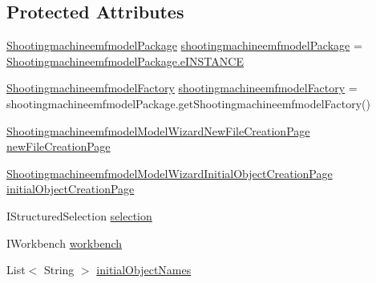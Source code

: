 \subsection*{Protected Attributes}
\begin{DoxyCompactItemize}
\item 
\hyperlink{interfaceshootingmachineemfmodel_1_1_shootingmachineemfmodel_package}{Shootingmachineemfmodel\-Package} \hyperlink{classshootingmachineemfmodel_1_1presentation_1_1_shootingmachineemfmodel_model_wizard_a8a2843875980f02f95e83eee1a814c6a}{shootingmachineemfmodel\-Package} = \hyperlink{interfaceshootingmachineemfmodel_1_1_shootingmachineemfmodel_package_a1a262932821c602a7ee1e9cbb214c625}{Shootingmachineemfmodel\-Package.\-e\-I\-N\-S\-T\-A\-N\-C\-E}
\item 
\hyperlink{interfaceshootingmachineemfmodel_1_1_shootingmachineemfmodel_factory}{Shootingmachineemfmodel\-Factory} \hyperlink{classshootingmachineemfmodel_1_1presentation_1_1_shootingmachineemfmodel_model_wizard_a3a08336aea063feb905341ca00505e65}{shootingmachineemfmodel\-Factory} = shootingmachineemfmodel\-Package.\-get\-Shootingmachineemfmodel\-Factory()
\item 
\hyperlink{classshootingmachineemfmodel_1_1presentation_1_1_shootingmachineemfmodel_model_wizard_1_1_shooti0374ed52aef5c158aa4d43d4797c2d9f}{Shootingmachineemfmodel\-Model\-Wizard\-New\-File\-Creation\-Page} \hyperlink{classshootingmachineemfmodel_1_1presentation_1_1_shootingmachineemfmodel_model_wizard_a8c6b0f5201dfc93a032ac20be8f15641}{new\-File\-Creation\-Page}
\item 
\hyperlink{classshootingmachineemfmodel_1_1presentation_1_1_shootingmachineemfmodel_model_wizard_1_1_shootia3fbc6bd8d9af3fefbb57f601e613dce}{Shootingmachineemfmodel\-Model\-Wizard\-Initial\-Object\-Creation\-Page} \hyperlink{classshootingmachineemfmodel_1_1presentation_1_1_shootingmachineemfmodel_model_wizard_a0d0d4ca165d6a270b8cb4a58648f4dbc}{initial\-Object\-Creation\-Page}
\item 
I\-Structured\-Selection \hyperlink{classshootingmachineemfmodel_1_1presentation_1_1_shootingmachineemfmodel_model_wizard_aad927182a7d8d6009308666dfa170cb6}{selection}
\item 
I\-Workbench \hyperlink{classshootingmachineemfmodel_1_1presentation_1_1_shootingmachineemfmodel_model_wizard_a5170c9853972c24bd2ee4d11ad384fde}{workbench}
\item 
List$<$ String $>$ \hyperlink{classshootingmachineemfmodel_1_1presentation_1_1_shootingmachineemfmodel_model_wizard_a753afad4f6eaf435624040fa541d2b95}{initial\-Object\-Names}
\end{DoxyCompactItemize}


